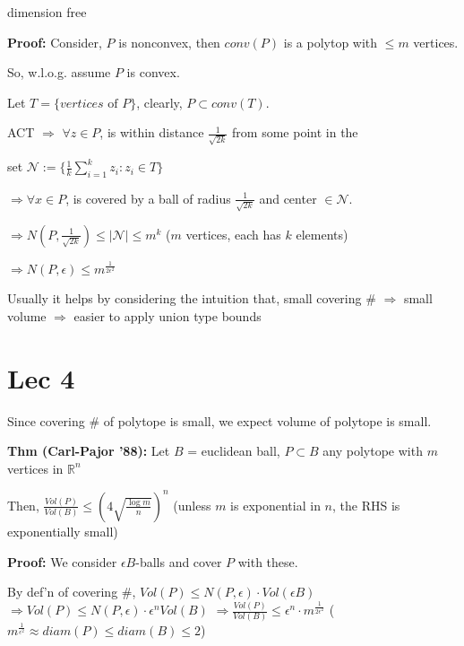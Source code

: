 \documentclass[12pt]{article}
\begin{document}
\begin{itemize}
    dimension free
    
    \textbf{Proof:} Consider, $P$ is nonconvex, then $conv(P)$ is a polytop with $\leq m$ vertices.
    
    So, w.l.o.g. assume $P$ is convex.
    
    Let $T = \{vertices\text{ of }P\}$, clearly, $P \subset conv(T)$.
    
    ACT $\Rightarrow$ $\forall z \in P$, is within distance $\frac{1}{\sqrt{2k}}$ from some point in the
    
    set $\mathcal{N} := \{\frac{1}{k} \sum_{i=1}^k z_i : z_i \in T\}$
    
    $\Rightarrow \forall x \in P$, is covered by a ball of radius $\frac{1}{\sqrt{2k}}$ and center $\in \mathcal{N}$.
    
    $\Rightarrow N(P, \frac{1}{\sqrt{2k}}) \leq |\mathcal{N}| \leq m^k$ \hspace{1cm} ($m$ vertices, each has $k$ elements)
    
    $\Rightarrow N(P, \epsilon) \leq m^{\frac{1}{2\epsilon^2}}$
\end{itemize}

Usually it helps by considering the intuition that, small covering \# $\Rightarrow$ small volume
$\Rightarrow$ easier to apply union type bounds

\section*{Lec 4}

Since covering \# of polytope is small, we expect volume of polytope is small.

\textbf{Thm (Carl-Pajor '88):} Let $B$ = euclidean ball, $P \subset B$ any polytope with $m$ vertices in $\mathbb{R}^n$

Then, $\frac{Vol(P)}{Vol(B)} \leq \left(4\sqrt{\frac{\log m}{n}}\right)^n$ \hspace{1cm} (unless $m$ is exponential in $n$, the RHS is exponentially small)

\textbf{Proof:} We consider $\epsilon B$-balls and cover $P$ with these.

By def'n of covering \#, $Vol(P) \leq N(P,\epsilon) \cdot Vol(\epsilon B)$
$\Rightarrow Vol(P) \leq N(P,\epsilon) \cdot \epsilon^n Vol(B)$
$\Rightarrow \frac{Vol(P)}{Vol(B)} \leq \epsilon^n \cdot m^{\frac{1}{2\epsilon^2}}$ \hspace{1cm} ($m^{\frac{1}{\epsilon^2}} \approx diam(P) \leq diam(B) \leq 2$)
\end{document}
